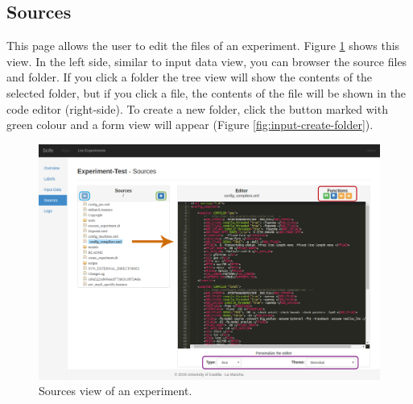 \documentclass[11pt]{article}
\begin{document}
\subsection{Sources}\label{sec:sources}
This page allows the user to edit the files of an experiment. Figure \ref{fig:sources} shows this view. In the left side, similar to input data view, you can browser the source files and folder. If you click a folder the tree view will show the contents of the selected folder, but if you click a file, the contents of the file will be shown in the code editor (right-side). To create a new folder, click the button marked with green colour and a form view will appear (Figure \ref{fig:input-create-folder}).\\
\begin{figure}[htp]
	\centering
	\includegraphics[width=\linewidth]{img/sources}
	\caption{Sources view of an experiment.}
	\label{fig:sources}
\end{figure}
\end{document}
